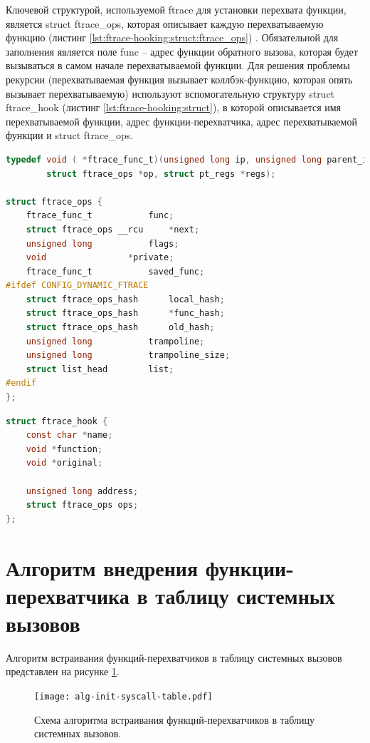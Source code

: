         Ключевой структурой, используемой ftrace для установки перехвата функции,
        является struct ftrace\_ops, которая описывает каждую перехватываемую функцию
        (листинг \ref{lst:ftrace-hooking:struct:ftrace_ops}) \cite{linux-ftrace_ops}.
        Обязательной для заполнения является поле func -- адрес функции обратного вызова,
        которая будет вызываться в самом начале перехватываемой функции.
        Для решения проблемы рекурсии (перехватываемая функция вызывает коллбэк-функцию, которая опять вызывает перехватываемую)
        используют вспомогательную структуру struct ftrace\_hook (листинг \ref{lst:ftrace-hooking:struct}), в которой описывается
        имя перехватываемой функции, 
        адрес функции-перехватчика,
        адрес перехватываемой функции и
        struct ftrace\_ops.

    \begin{lstlisting}[language=C, label=lst:ftrace-hooking:struct:ftrace_ops, title=struct ftrace\_ops]
typedef void ( *ftrace_func_t)(unsigned long ip, unsigned long parent_ip,
        struct ftrace_ops *op, struct pt_regs *regs);

struct ftrace_ops {
    ftrace_func_t			func;
    struct ftrace_ops __rcu		*next;
    unsigned long			flags;
    void				*private;
    ftrace_func_t			saved_func;
#ifdef CONFIG_DYNAMIC_FTRACE
    struct ftrace_ops_hash		local_hash;
    struct ftrace_ops_hash		*func_hash;
    struct ftrace_ops_hash		old_hash;
    unsigned long			trampoline;
    unsigned long			trampoline_size;
    struct list_head		list;
#endif
};
    \end{lstlisting}

    \begin{lstlisting}[language=C, label=lst:ftrace-hooking:struct, title=struct ftrace\_hook]
struct ftrace_hook {
    const char *name;
    void *function;
    void *original;

    unsigned long address;
    struct ftrace_ops ops;
};
    \end{lstlisting}

    \section{Алгоритм внедрения функции-перехватчика в таблицу системных вызовов}
        \label{design:alg:hook:syscall_table}
        Алгоритм встраивания функций-перехватчиков в таблицу
        системных вызовов представлен на рисунке \ref{schema:syscall:init:hook:alg}.
        \begin{figure}[h!]
            \centering
            \texttt{[image: alg-init-syscall-table.pdf]}
            \caption{Схема алгоритма встраивания функций-перехватчиков в таблицу системных вызовов.}
            \label{schema:syscall:init:hook:alg}
        \end{figure}

